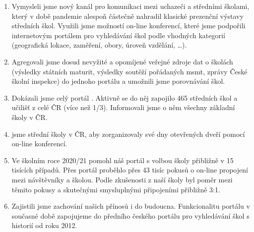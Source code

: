 \begin{enumerate}
  \item Vymysleli jsme nový kanál pro komunikaci mezi uchazeči a středními školami, který v době pandemie alespoň částečně nahradil klasické prezenční výstavy středních škol.
    Využili jsme možností on-line konferencí, které jsme podpořili internetovým portálem pro vyhledávání škol podle vhodných kategorií (geografická lokace, zaměření, obory, úroveň vzdělání, \ldots).

  \item Agregovali jsme dosud nevyžité a opomíjené veřejné zdroje dat o školách (výsledky státních maturit, výsledky soutěží pořádaných \acrshort{msmt}, zprávy České školní inspekce)
    do  jednoho portálu a umožnili jsme porovnávání škol.

  \item Dokázali jsme celý portál . Aktivně se do něj zapojilo 465 středních škol a učilišť z celé ČR (více než 1/3).
    Informovali jsme o něm všechny základní školy v ČR.

  \item {} jsme střední školy v ČR, aby zorganizovaly své dny otevřených dveří pomocí on-line konferencí.
  \item Ve školním roce 2020/21 pomohl náš portál s volbou školy přibližně v 15 tisících případů. 
    Přes portál proběhlo přes 43 tisíc pokusů o on-line propojení mezi návštěvníky a školou.
    Podle zkušenosti z naší školy byl poměr mezi těmito pokusy a skutečnými smysluplnými připojeními přibližně 3:1. 

  \item Zajistili jsme zachování našich přínosů i do budoucna. Funkcionalitu portálu v současné době zapojujeme do předního českého portálu pro vyhledávání škol s historií od roku 2012.
\end{enumerate}


